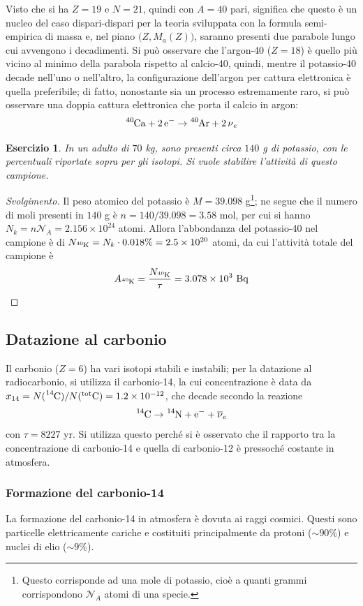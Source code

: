 \documentclass[11pt, a4paper]{scrartcl}
\newenvironment{svolgimento}{\renewcommand\qedsymbol{$\blacksquare$}\begin{proof}[Svolgimento]}{\end{proof}}
\theoremstyle{style}
\newtheorem{esercizio}{Esercizio}[section]
\numberwithin{equation}{subsection}
\begin{document}
Visto che si ha $Z=19$ e $N=21$, quindi con $A= 40$ pari, significa che questo \`e un nucleo del caso dispari-dispari per la teoria sviluppata con la formula semi-empirica di massa e, nel piano $\big(Z,M_a(Z)\big)$, saranno presenti due parabole lungo cui avvengono i decadimenti.
Si pu\`o osservare che l'argon-40 ($Z=18$) \`e quello pi\`u vicino al minimo della parabola rispetto al calcio-40, quindi, mentre il potassio-40 decade nell'uno o nell'altro, la configurazione dell'argon per cattura elettronica \`e quella preferibile; di fatto, nonostante sia un processo estremamente raro, si pu\`o osservare una doppia cattura elettronica che porta il calcio in argon:
\[
	\ce{^{40}Ca + 2e-} \to  \ce{^{40}Ar + 2\nu _e}
\] 
\begin{esercizio}
In un adulto di $70$ kg, sono presenti circa $140$ g di potassio, con le percentuali riportate sopra per gli isotopi.
Si vuole stabilire l'attivit\`a di questo campione.
\end{esercizio}
\begin{svolgimento}
	Il peso atomico del potassio \`e $M = 39.098$ g\footnote{Questo corrisponde ad una mole di potassio, cio\`e a quanti grammi corrispondono $\mathcal{N} _A$ atomi di una specie.}; ne segue che il numero di moli presenti in $140$ g \`e $n = 140 / 39.098 = 3.58$ mol, per cui si hanno $N_k = n \mathcal{N} _A = 2.156 \times 10^{24}$ atomi.
Allora l'abbondanza del potassio-40 nel campione \`e di $N_{\ce{^{40}K}} = N_k \cdot 0.018\% = 2.5 \times 10^{20}$ atomi, da cui l'attivit\`a totale del campione \`e 
\[
	A_{\ce{^{40}K}} = \frac{N_{\ce{^{40}K}}}{\tau } = 3.078 \times 10^{3} \text{ Bq}
\] 

\end{svolgimento}
\subsection{Datazione al carbonio}

Il carbonio ($Z=6$) ha vari isotopi stabili e instabili; per la datazione al radiocarbonio, si utilizza il carbonio-14, la cui concentrazione \`e data da $x_{14} = N(\ce{^{14}C}) / N(^{\text{tot}}\ce{C}) = 1.2 \times 10^{-12}$, che decade secondo la reazione
\[
	\ce{^{14}C}\to \ce{^{14}N + e- + \overline{\nu }_e} 
\] 
con $\tau = 8227$ yr.
Si utilizza questo perch\'e si \`e osservato che il rapporto tra la concentrazione di carbonio-14 e quella di carbonio-12 \`e pressoch\'e costante in atmosfera.

\subsubsection{Formazione del carbonio-14}
La formazione del carbonio-14 in atmosfera \`e dovuta ai raggi cosmici.
Questi sono particelle elettricamente cariche e costituiti principalmente da protoni ($\sim 90\%$) e nuclei di elio ($\sim 9\%$).
\end{document}
